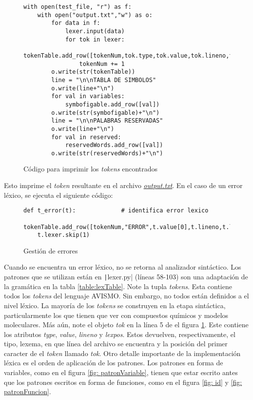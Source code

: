 \begin{figure}[H]
    \begin{verbatim}
with open(test_file, "r") as f:
    with open("output.txt","w") as o:
        for data in f:
            lexer.input(data)
            for tok in lexer:
                tokenTable.add_row([tokenNum,tok.type,tok.value,tok.lineno,tok.lexpos,test_file])
                tokenNum += 1
        o.write(str(tokenTable))
        line = "\n\nTABLA DE SIMBOLOS"
        o.write(line+"\n")
        for val in variables:
            symbofigable.add_row([val])
        o.write(str(symbofigable)+"\n")
        line = "\n\nPALABRAS RESERVADAS"
        o.write(line+"\n")
        for val in reserved:
            reservedWords.add_row([val])
        o.write(str(reservedWords)+"\n")
\end{verbatim}
    \caption{Código para imprimir los \textit{tokens} encontrados}
    \label{fig: scanner}
\end{figure}
Esto imprime el \textit{token} resultante en el archivo \href{https://github.com/aramis-matos/comp4999_compilers_project/blob/master/code/python_remake/output.txt}{\textit{output.txt}}. En el caso de un error léxico, se ejecuta el siguiente código:
\begin{figure}[H]
\begin{verbatim}
def t_error(t):             # identifica error lexico
    tokenTable.add_row([tokenNum,"ERROR",t.value[0],t.lineno,t.lexpos,test_file])
    t.lexer.skip(1)
\end{verbatim}
\caption{Gestión de errores}
\label{fig: errores}
\end{figure}
Cuando se encuentra un error léxico, no se retorna al analizador sintáctico. Los patrones que se utilizan están en \texttt|lexer.py| (líneas 58-103) son una adaptación de la gramática en la tabla \ref{table:lexTable}. Note la tupla \textit{tokens}.
Esta contiene todos los \textit{tokens} del lenguaje AVISMO. Sin embargo, no todos están definidos a el nivel léxico. La mayoría de los \textit{tokens} se construyen en la etapa sintáctica, particularmente los que tienen que ver con compuestos químicos y modelos moleculares.
Más aún, note el objeto \textit{tok} en la línea 5 de el figura \ref{fig: scanner}.
Este contiene los atributos \textit{type}, \textit{value}, \textit{lineno} y \textit{lexpos}.
Estos devuelven, respectivamente, el tipo, lexema, en que línea del archivo se encuentra y la posición del primer caracter de el \textit{token} llamado \textit{tok}. 
Otro detalle importante de la implementación léxica es el orden de aplicación de los patrones. 
Los patrones en forma de variables, como en el figura \ref{fig: patronVariable}, tienen que estar escrito antes que los patrones escritos en forma de funciones, como en el figura \ref{fig: id} y \ref{fig: patronFuncion}.

